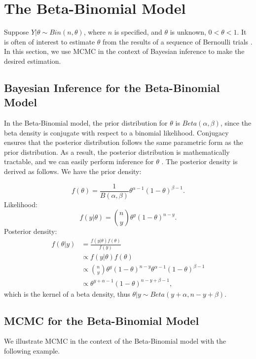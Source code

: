 \documentclass[12pt,openany]{article}
\theoremstyle{remark} %
\theoremstyle{definition} %
\begin{document}

\section{The Beta-Binomial Model}

Suppose $Y|\theta \sim Bin(n,\theta)$, where $n$ is specified, and $\theta$ is unknown, $0 < \theta <1$. It is often of interest to estimate $\theta$ from the results of a sequence of Bernoulli trials \citep{bayesian}. In this section, we use MCMC in the context of Bayesian inference to make the desired estimation.  

\subsection{Bayesian Inference for the Beta-Binomial Model}

In the Beta-Binomial model, the prior distribution for $\theta$ is $Beta(\alpha,\beta)$, since the beta density is conjugate with respect to a binomial likelihood. Conjugacy ensures that the posterior distribution follows the same parametric form as the prior distribution. As a result, the posterior distribution is mathematically tractable, and we can easily perform inference for $\theta$ \citep{bayesian}. The posterior density is derived as follows.
We have the prior density:

$$f(\theta) = \frac{1}{B(\alpha,\beta)} \theta^{\alpha-1} (1-\theta)^{\beta-1}.$$
Likelihood:
$$f(y|\theta) = {n \choose y} \theta^y (1-\theta)^{n-y}.$$
Posterior density:
\begin{align*}
f(\theta|y) &= 
	\frac{f(y|\theta)f(\theta)}{f(y)} \\
	&\propto f(y|\theta)f(\theta) \\
	&\propto {n \choose y} \theta^y (1-\theta)^{n-y} \theta^{\alpha-1} (1-\theta)^{\beta-1} \\
	&\propto \theta^{y+\alpha -1}(1-\theta)^{n-y+\beta-1},
\end{align*}
which is the kernel of a beta density, thus $\theta|y \sim Beta(y+\alpha,n-y+\beta)$.

\subsection{MCMC for the Beta-Binomial Model}

We illustrate MCMC in the context of the Beta-Binomial model with the following example.
\end{document}
